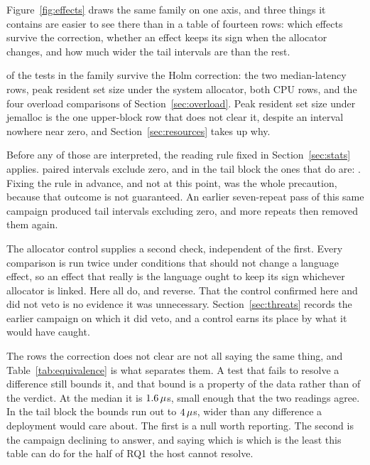 \documentclass[english,oneside,a4paper,censored,csm,software-track-2020]{HYthesisML}
\begin{document}
Figure~\ref{fig:effects} draws the same family on one axis, and three things it contains are
easier to see there than in a table of fourteen rows: which effects survive the correction,
whether an effect keeps its sign when the allocator changes, and how much wider the tail
intervals are than the rest.

\NSignificant{} of the \NTests{} tests in the family survive the Holm correction: the two
median-latency rows, peak resident set size under the system allocator, both CPU rows, and the
four overload comparisons of Section~\ref{sec:overload}. Peak resident set size under jemalloc is
the one upper-block row that does not clear it, despite an interval nowhere near zero, and
Section~\ref{sec:resources} takes up why.

Before any of those are interpreted, the reading rule fixed in Section~\ref{sec:stats} applies.
\NExclZero{} paired intervals exclude zero, and in the tail block the ones that do are:
\TailExclZeroRows. Fixing the rule in advance, and not at this point, was the whole
precaution, because that outcome is not guaranteed. An earlier seven-repeat pass of this same
campaign produced tail intervals excluding zero, and more repeats then removed them again.

The allocator control supplies a second check, independent of the first. Every comparison is run
twice under conditions that should not change a language effect, so an effect that really is the
language ought to keep its sign whichever allocator is linked. Here \CrossAllocConsistent{} all
do, and \NCrossAllocReversed{} reverse. That the control confirmed here and did not veto is no
evidence it was unnecessary. Section~\ref{sec:threats} records the earlier campaign on which it
did veto, and a control earns its place by what it would have caught.

The \NEqvUnresolved{} rows the correction does not clear are not all saying the same thing, and
Table~\ref{tab:equivalence} is what separates them. A test that fails to resolve a difference
still bounds it, and that bound is a property of the data rather than of the verdict. At the
median it is $1.6\,\mu$s, small enough that the two readings agree. In the tail block
the bounds run out to $4\,\mu$s, wider than any difference a deployment would care
about. The first is a null worth reporting. The second is the campaign declining to answer, and
saying which is which is the least this table can do for the half of RQ1 the host cannot resolve.
\end{document}
